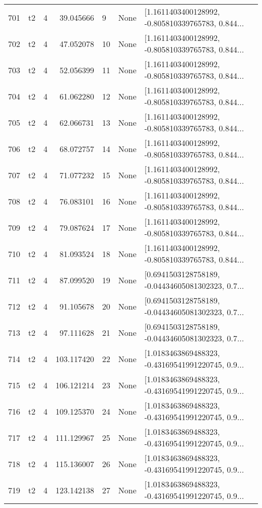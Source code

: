 \begin{tabular}{lllrlll}
701 &  t2 &   4 &    39.045666 &    9 &  None &  [1.1611403400128992, -0.805810339765783, 0.844... \\
702 &  t2 &   4 &    47.052078 &   10 &  None &  [1.1611403400128992, -0.805810339765783, 0.844... \\
703 &  t2 &   4 &    52.056399 &   11 &  None &  [1.1611403400128992, -0.805810339765783, 0.844... \\
704 &  t2 &   4 &    61.062280 &   12 &  None &  [1.1611403400128992, -0.805810339765783, 0.844... \\
705 &  t2 &   4 &    62.066731 &   13 &  None &  [1.1611403400128992, -0.805810339765783, 0.844... \\
706 &  t2 &   4 &    68.072757 &   14 &  None &  [1.1611403400128992, -0.805810339765783, 0.844... \\
707 &  t2 &   4 &    71.077232 &   15 &  None &  [1.1611403400128992, -0.805810339765783, 0.844... \\
708 &  t2 &   4 &    76.083101 &   16 &  None &  [1.1611403400128992, -0.805810339765783, 0.844... \\
709 &  t2 &   4 &    79.087624 &   17 &  None &  [1.1611403400128992, -0.805810339765783, 0.844... \\
710 &  t2 &   4 &    81.093524 &   18 &  None &  [1.1611403400128992, -0.805810339765783, 0.844... \\
711 &  t2 &   4 &    87.099520 &   19 &  None &  [0.6941503128758189, -0.04434605081302323, 0.7... \\
712 &  t2 &   4 &    91.105678 &   20 &  None &  [0.6941503128758189, -0.04434605081302323, 0.7... \\
713 &  t2 &   4 &    97.111628 &   21 &  None &  [0.6941503128758189, -0.04434605081302323, 0.7... \\
714 &  t2 &   4 &   103.117420 &   22 &  None &  [1.0183463869488323, -0.43169541991220745, 0.9... \\
715 &  t2 &   4 &   106.121214 &   23 &  None &  [1.0183463869488323, -0.43169541991220745, 0.9... \\
716 &  t2 &   4 &   109.125370 &   24 &  None &  [1.0183463869488323, -0.43169541991220745, 0.9... \\
717 &  t2 &   4 &   111.129967 &   25 &  None &  [1.0183463869488323, -0.43169541991220745, 0.9... \\
718 &  t2 &   4 &   115.136007 &   26 &  None &  [1.0183463869488323, -0.43169541991220745, 0.9... \\
719 &  t2 &   4 &   123.142138 &   27 &  None &  [1.0183463869488323, -0.43169541991220745, 0.9... \\

\end{tabular}

